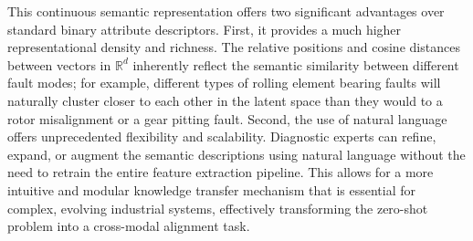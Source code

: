 This continuous semantic representation offers two significant advantages over standard binary attribute descriptors. First, it provides a much higher representational density and richness. The relative positions and cosine distances between vectors in $\mathbb{R}^d$ inherently reflect the semantic similarity between different fault modes; for example, different types of rolling element bearing faults will naturally cluster closer to each other in the latent space than they would to a rotor misalignment or a gear pitting fault. Second, the use of natural language offers unprecedented flexibility and scalability. Diagnostic experts can refine, expand, or augment the semantic descriptions using natural language without the need to retrain the entire feature extraction pipeline. This allows for a more intuitive and modular knowledge transfer mechanism that is essential for complex, evolving industrial systems, effectively transforming the zero-shot problem into a cross-modal alignment task.

